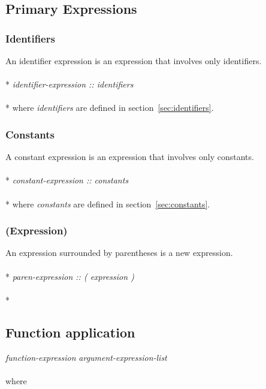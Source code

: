 \subsection{Primary Expressions}

\subsubsection{Identifiers}
An identifier expression is an expression that involves only identifiers. \\\\*
\emph{identifier-expression :: identifiers}\\ \\*
where \emph{identifiers} are defined in section~\ref{sec:identifiers}.


\subsubsection{Constants}
A constant expression is an expression that involves only constants. \\ \\*
\emph{constant-expression :: constants} \\ \\*
where \emph{constants} are defined in section~\ref{sec:constants}.

\subsubsection{(Expression)}
An expression surrounded by parentheses is a new expression. \\ \\*
\emph{paren-expression :: ( expression )} \\ \\*

\subsection{Function application}
    \emph{function-expression} \emph{argument-expression-list} \\ \\
    where\\
    
